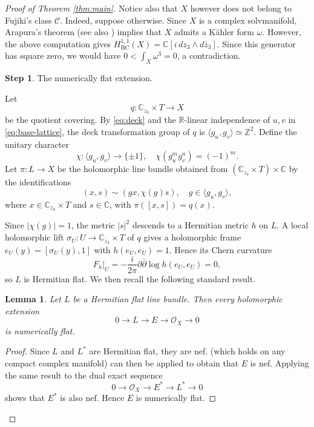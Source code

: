 \documentclass[11pt]{amsart}
\newcommand{\C}{\mathbb C}
\newcommand{\Z}{\mathbb Z}
\newcommand{\OO}{\mathcal O}
\numberwithin{equation}{section}
\newtheorem{lemma}  [theorem]     {Lemma}
\theoremstyle{definition}
\theoremstyle{plain}
\theoremstyle{plain}
\theoremstyle{definition}
\theoremstyle{stepstyle}
\newtheorem{step}{Step}[section]
\begin{document}
\begin{proof}[{Proof of Theorem \ref{thm:main}}]
		Notice also that $X$ however does not belong to Fujiki's class
		$\mathcal C$.
		Indeed, suppose otherwise. Since $X$ is a complex solvmanifold,
		Arapura's theorem \cite[Theorem~9]{Arapura}
		(see also \cite[Theorem~3.3]{AKtwisted})
		implies that $X$ admits a K\"ahler form $\omega$.
		However, the above computation gives
		$H^{1,1}_{\mathrm{BC}}(X)=\mathbb C[i\,dz_3\wedge d\bar z_3]$.
		Since this generator has square zero, we would have
		$0<\int_X\omega^3=0$, a contradiction.
		
		\begin{step}
			The numerically flat extension.
		\end{step}
		Let $$q:\C_{z_3}\times T\to X$$ be the quotient covering.
		By \eqref{eq:deck} and the $\mathbb R$-linear independence of $u,v$
		in \eqref{eq:base-lattice}, the deck transformation group of $q$ is
		$\langle g_u,g_v\rangle\simeq\Z^2$. Define the unitary character
		\begin{equation*}\label{eq:character}
			\chi:\langle g_u,g_v\rangle\longrightarrow\{\pm1\},
			\quad \chi(g_u^m g_v^n)=(-1)^m.
		\end{equation*}
		Let $\pi:L\to X$ be the holomorphic line bundle obtained from
		$(\C_{z_3}\times T)\times\C$ by the identifications
		$$
		(x,s)\sim(gx,\chi(g)s),
		\quad g\in\langle g_u,g_v\rangle,
		$$
		where $x\in\C_{z_3}\times T$ and $s\in\C$, with 
		$\pi([x,s])=q(x)$.
		
		Since $|\chi(g)|=1$, the metric $|s|^2$ descends to a Hermitian
		metric $h$ on $L$. A local holomorphic lift
		$\sigma_U:U\to\C_{z_3}\times T$ of $q$ gives a holomorphic frame
		$e_U(y)=[\sigma_U(y),1]$ with $h(e_U,e_U)=1$. Hence its Chern curvature
		$$
		F_h|_U=-\frac{i}{2\pi}\partial\bar\partial\log h(e_U,e_U)=0,
		$$
		so $L$ is Hermitian flat.
		We then recall the following standard result.
		
		\begin{lemma}\label{lem:extension-nf}
			Let $L$ be a  Hermitian flat line bundle. Then every holomorphic extension
			$$
			0\longrightarrow L\longrightarrow E\longrightarrow\OO_X\longrightarrow0
			$$
			is numerically flat.
		\end{lemma}
		
		\begin{proof}
			Since $L$ and $L^*$ are Hermitian flat, they are nef. 
			\cite[Proposition 1.15 (ii)]{DPS} (which holds on any compact complex
			manifold) can then be applied to obtain that $E$ is nef. Applying the same result to the dual exact sequence
			\[
			0\longrightarrow\OO_X\longrightarrow E^*
			\longrightarrow L^*\longrightarrow0
			\]
			shows that $E^*$ is also nef. Hence $E$ is numerically flat.
		\end{proof}
		

\end{proof}
\end{document}
